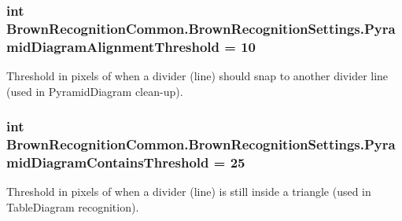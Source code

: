 \hypertarget{class_brown_recognition_common_1_1_brown_recognition_settings_a280bfefaddf7e6549e13715ead005853}{
\subsubsection[{\-Pyramid\-Diagram\-Alignment\-Threshold}]{\setlength{\rightskip}{0pt plus 5cm}int {\bf \-Brown\-Recognition\-Common.\-Brown\-Recognition\-Settings.\-Pyramid\-Diagram\-Alignment\-Threshold} = 10}}
\label{class_brown_recognition_common_1_1_brown_recognition_settings_a280bfefaddf7e6549e13715ead005853}


\-Threshold in pixels of when a divider (line) should snap to another divider line (used in \-Pyramid\-Diagram clean-\/up). 

\hypertarget{class_brown_recognition_common_1_1_brown_recognition_settings_a9d5220bd3119b66c88738645ee926141}{
\subsubsection[{\-Pyramid\-Diagram\-Contains\-Threshold}]{\setlength{\rightskip}{0pt plus 5cm}int {\bf \-Brown\-Recognition\-Common.\-Brown\-Recognition\-Settings.\-Pyramid\-Diagram\-Contains\-Threshold} = 25}}
\label{class_brown_recognition_common_1_1_brown_recognition_settings_a9d5220bd3119b66c88738645ee926141}


\-Threshold in pixels of when a divider (line) is still inside a triangle (used in \-Table\-Diagram recognition). 

